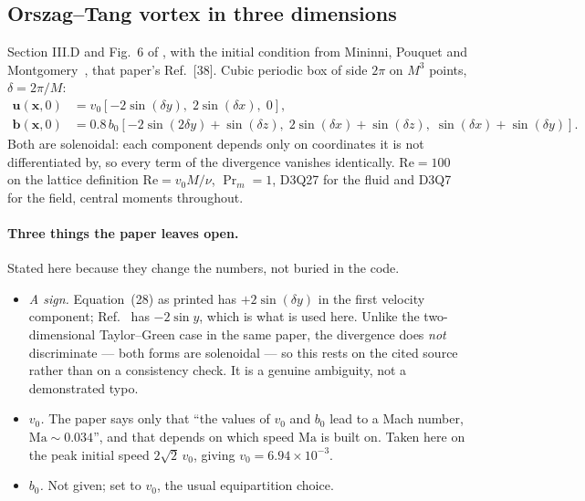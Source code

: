 \documentclass[11pt,a4paper]{article}
\newcommand{\uu}{\bm{u}}
\newcommand{\bb}{\bm{b}}
\newcommand{\xx}{\bm{x}}
\newcommand{\e}[1]{\times 10^{#1}}
\begin{document}
\subsection{Orszag--Tang vortex in three dimensions}
\label{sec:ot3d}

Section III.D and Fig.~6 of \cite{derosis2017pre}, with the initial condition
from Mininni, Pouquet and Montgomery~\cite{mininni2006}, that paper's Ref.~[38].
Cubic periodic box of side $2\pi$ on $M^3$ points, $\delta=2\pi/M$:
\begin{align}
  \uu(\xx,0) &= v_0\left[-2\sin(\delta y),\; 2\sin(\delta x),\; 0\right], \\
  \bb(\xx,0) &= 0.8\,b_0\left[-2\sin(2\delta y)+\sin(\delta z),\;
                              2\sin(\delta x)+\sin(\delta z),\;
                              \sin(\delta x)+\sin(\delta y)\right].
\end{align}
Both are solenoidal: each component depends only on coordinates it is not
differentiated by, so every term of the divergence vanishes identically.
$\mathrm{Re}=100$ on the lattice definition $\mathrm{Re}=v_0M/\nu$, $\Pr_m=1$,
D3Q27 for the fluid and D3Q7 for the field, central moments throughout.

\paragraph{Three things the paper leaves open.} Stated here because they change
the numbers, not buried in the code.
\begin{itemize}[leftmargin=1.4em,itemsep=2pt]
\item \emph{A sign.} Equation~(28) as printed has $+2\sin(\delta y)$ in the first
      velocity component; Ref.~\cite{mininni2006} has $-2\sin y$, which is what
      is used here. Unlike the two-dimensional Taylor--Green case in the same
      paper, the divergence does \emph{not} discriminate --- both forms are
      solenoidal --- so this rests on the cited source rather than on a
      consistency check. It is a genuine ambiguity, not a demonstrated typo.
\item \emph{$v_0$.} The paper says only that ``the values of $v_0$ and $b_0$ lead
      to a Mach number, $\mathrm{Ma}\sim0.034$'', and that depends on which speed
      $\mathrm{Ma}$ is built on. Taken here on the peak initial speed
      $2\sqrt2\,v_0$, giving $v_0=6.94\e{-3}$.
\item \emph{$b_0$.} Not given; set to $v_0$, the usual equipartition choice.
\end{itemize}
\end{document}
